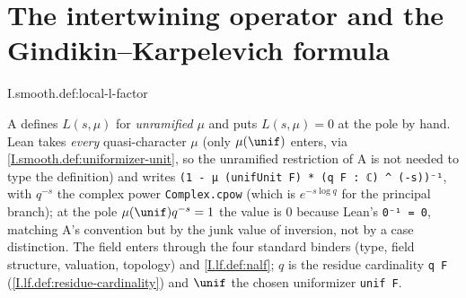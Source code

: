 \section{The intertwining operator and the Gindikin--Karpelevich formula}

\begin{definition}
\end{definition}
\begin{tfformal}{I.smooth.def:local-l-factor}
\begin{tffidelity}
A defines $L(s,\mu)$ for \emph{unramified} $\mu$ and puts $L(s,\mu)=0$ at the pole by hand. Lean takes \emph{every} quasi-character $\mu$ (only $\mu(\unif)$ enters, via \cref{I.smooth.def:uniformizer-unit}, so the unramified restriction of A is not needed to type the definition) and writes \texttt{(1 - μ (unifUnit F) * (q F : ℂ) \^{} (-s))⁻¹}, with $q^{-s}$ the complex power \texttt{Complex.cpow} (which is $e^{-s\log q}$ for the principal branch); at the pole $\mu(\unif)q^{-s}=1$ the value is $0$ because Lean's \texttt{0⁻¹ = 0}, matching A's convention but by the junk value of inversion, not by a case distinction.  The field enters through the four standard binders (type, field structure, valuation, topology) and \cref{I.lf.def:nalf}; $q$ is the residue cardinality \texttt{q F} (\cref{I.lf.def:residue-cardinality}) and $\unif$ the chosen uniformizer \texttt{unif F}.
\end{tffidelity}
\end{tfformal}

